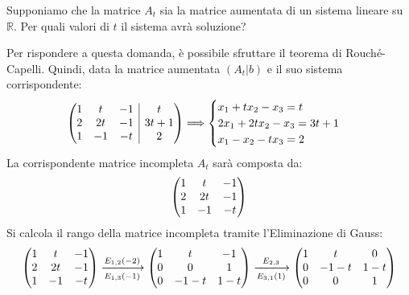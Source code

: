 \documentclass[a4paper]{article}
\makeatletter
\newenvironment{rowequmat}[1]{\left(\array{@{}#1@{}}}{\endarray\right)}
\makeatother
\begin{document}
	Supponiamo che la matrice $A_{t}$ sia la matrice aumentata di un sistema lineare su $\mathbb{R}$. Per quali valori di $t$ il sistema avrà soluzione?\newline
	
	\noindent
	Per rispondere a questa domanda, è possibile sfruttare il teorema di Rouché-Capelli. Quindi, data la matrice aumentata $\left(A_{t}|b\right)$ e il suo sistema corrispondente:
	\begin{equation*}
		\begin{rowequmat}{ccc|c}
			1 & t & -1 & t \\
			2 & 2t & -1 & 3t+1 \\
			1 & -1 & -t & 2
		\end{rowequmat} \Longrightarrow
		\begin{cases}
			x_{1} + tx_{2} - x_{3} = t \\
			2x_{1} + 2tx_{2} - x_{3} = 3t+1 \\
			x_{1} - x_{2} - tx_{3} = 2
		\end{cases}
	\end{equation*}
	La corrispondente matrice incompleta $A_{t}$ sarà composta da:
	\begin{equation*}
		\begin{rowequmat}{ccc}
			1 & t & -1  \\
			2 & 2t & -1 \\
			1 & -1 & -t
		\end{rowequmat}
	\end{equation*}
	Si calcola il rango della matrice incompleta tramite l'Eliminazione di Gauss:
	\begin{gather*}
		\begin{rowequmat}{ccc}
			1 & t & -1  \\
			2 & 2t & -1 \\
			1 & -1 & -t
		\end{rowequmat} \xlongrightarrow[E_{1,3}\left(-1\right)]{E_{1,2}\left(-2\right)}
		\begin{rowequmat}{ccc}
			1 & t & -1  \\
			0 & 0 &  1 \\
			0 & -1-t & 1-t
		\end{rowequmat} \xlongrightarrow[E_{3,1}\left(1\right)]{E_{2,3}}
		\begin{rowequmat}{ccc}
			1 & t & 0  \\
			0 & -1-t & 1-t \\
			0 & 0 &  1
		\end{rowequmat}
	\end{gather*}
\end{document}
